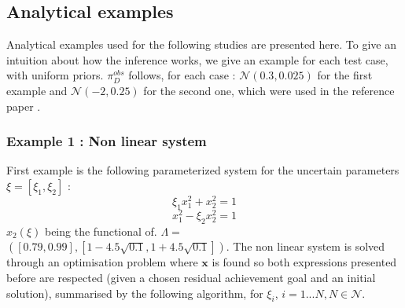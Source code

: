 \documentclass[11pt, a4paper, English]{report}
\begin{document}
\subsection{Analytical examples}
Analytical examples used for the following studies are presented here. To give an intuition about how the inference works, we give an example for each test case, with uniform priors. $\pi_D^{obs}$ follows, for each case :   $\mathcal{N}(0.3, 0.025)$ for the first example and $\mathcal{N}(-2, 0.25)$ for the second one, which were used in the reference paper \cite{Tim2}. 
\subsubsection{Example 1 : Non linear system}
First example is the following parameterized system for the uncertain parameters ${\xi} = [\xi_1, \xi_2]$ :
$$ \xi_1 x_1^2 + x_2^2 = 1 $$
$$ x_1^2 - \xi_2 x_2^2 = 1 $$
$x_2(\xi)$ being the functional of.  $\Lambda =$  $([0.79, 0.99],[1-4.5\sqrt{0.1}, 1+4.5\sqrt{0.1}])$. The non linear system is solved through an optimisation problem where  $\boldsymbol{x}$ is found so both expressions presented before are respected (given a chosen residual achievement goal and an initial solution), summarised by the following algorithm, for $\xi_i$, $i=1...N, N \in \mathcal{N}$.\\
\end{document}
